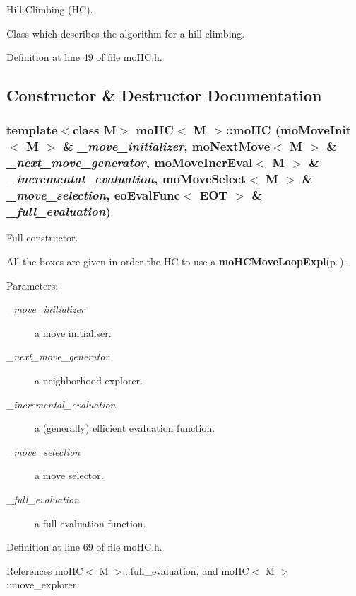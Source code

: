 Hill Climbing (HC). 

Class which describes the algorithm for a hill climbing. 



Definition at line 49 of file mo\-HC.h.

\subsection{Constructor \& Destructor Documentation}
\subsubsection{\setlength{\rightskip}{0pt plus 5cm}template$<$class M$>$ {\bf mo\-HC}$<$ M $>$::{\bf mo\-HC} ({\bf mo\-Move\-Init}$<$ M $>$ \& {\em \_\-move\_\-initializer}, {\bf mo\-Next\-Move}$<$ M $>$ \& {\em \_\-next\_\-move\_\-generator}, {\bf mo\-Move\-Incr\-Eval}$<$ M $>$ \& {\em \_\-incremental\_\-evaluation}, {\bf mo\-Move\-Select}$<$ M $>$ \& {\em \_\-move\_\-selection}, {\bf eo\-Eval\-Func}$<$ {\bf EOT} $>$ \& {\em \_\-full\_\-evaluation})\hspace{0.3cm}{\tt  [inline]}}\label{classmo_h_c_a0}


Full constructor. 

All the boxes are given in order the HC to use a {\bf mo\-HCMove\-Loop\-Expl}{\rm (p.\,\pageref{classmo_h_c_move_loop_expl})}.

\begin{Desc}
\item[Parameters:]
\begin{description}
\item[{\em \_\-move\_\-initializer}]a move initialiser. \item[{\em \_\-next\_\-move\_\-generator}]a neighborhood explorer. \item[{\em \_\-incremental\_\-evaluation}]a (generally) efficient evaluation function. \item[{\em \_\-move\_\-selection}]a move selector. \item[{\em \_\-full\_\-evaluation}]a full evaluation function. \end{description}
\end{Desc}


Definition at line 69 of file mo\-HC.h.

References mo\-HC$<$ M $>$::full\_\-evaluation, and mo\-HC$<$ M $>$::move\_\-explorer.
